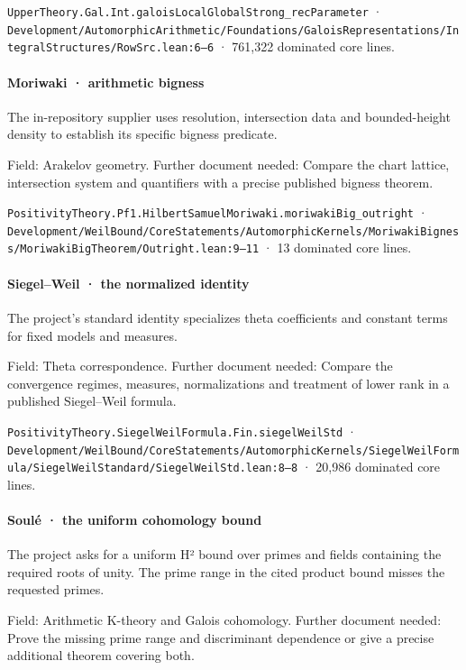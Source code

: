 \nolinkurl{UpperTheory.Gal.Int.galoisLocalGlobalStrong_recParameter} · \nolinkurl{Development/AutomorphicArithmetic/Foundations/GaloisRepresentations/IntegralStructures/RowSrc.lean:6–6} · 761,322 dominated core lines.

\paragraph{Moriwaki · arithmetic bigness}

The in-repository supplier uses resolution, intersection data and bounded-height density to establish its specific bigness predicate.

Field: Arakelov geometry. Further document needed: Compare the chart lattice, intersection system and quantifiers with a precise published bigness theorem.

\nolinkurl{PositivityTheory.Pf1.HilbertSamuelMoriwaki.moriwakiBig_outright} · \nolinkurl{Development/WeilBound/CoreStatements/AutomorphicKernels/MoriwakiBigness/MoriwakiBigTheorem/Outright.lean:9–11} · 13 dominated core lines.

\paragraph{Siegel–Weil · the normalized identity}

The project’s standard identity specializes theta coefficients and constant terms for fixed models and measures.

Field: Theta correspondence. Further document needed: Compare the convergence regimes, measures, normalizations and treatment of lower rank in a published Siegel–Weil formula.

\nolinkurl{PositivityTheory.SiegelWeilFormula.Fin.siegelWeilStd} · \nolinkurl{Development/WeilBound/CoreStatements/AutomorphicKernels/SiegelWeilFormula/SiegelWeilStandard/SiegelWeilStd.lean:8–8} · 20,986 dominated core lines.

\paragraph{Soulé · the uniform cohomology bound}

The project asks for a uniform H² bound over primes and fields containing the required roots of unity. The prime range in the cited product bound misses the requested primes.

Field: Arithmetic K-theory and Galois cohomology. Further document needed: Prove the missing prime range and discriminant dependence or give a precise additional theorem covering both.

